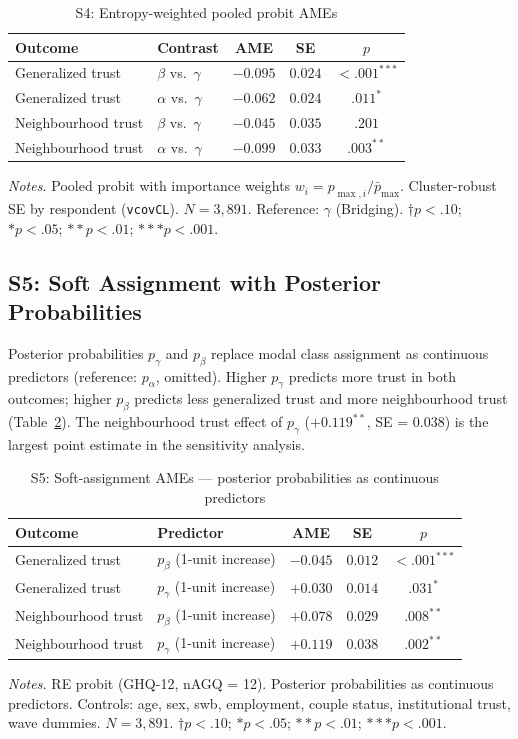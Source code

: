 \documentclass[12pt, a4paper]{article}
\newcommand{\tablenote}[1]{\vspace{4pt}\par\footnotesize\textit{Notes.} #1}
\begin{document}
\begin{table}[H]
\centering
\caption{S4: Entropy-weighted pooled probit AMEs}
\label{tab:A15_entropy}
\small
\begin{tabular}{llccc}
\hline\hline
  Outcome & Contrast & AME & SE & $p$ \\
\hline
  Generalized trust   & $\beta$ vs.\ $\gamma$ & $-0.095$ & $0.024$ & $<.001^{***}$ \\
  Generalized trust   & $\alpha$ vs.\ $\gamma$ & $-0.062$ & $0.024$ & $.011^{*}$ \\
  Neighbourhood trust & $\beta$ vs.\ $\gamma$ & $-0.045$ & $0.035$ & $.201$ \\
  Neighbourhood trust & $\alpha$ vs.\ $\gamma$ & $-0.099$ & $0.033$ & $.003^{**}$ \\
\hline\hline
\end{tabular}
\tablenote{Pooled probit with importance weights $w_i = p_{\max,i}/\bar{p}_{\max}$.
Cluster-robust SE by respondent (\texttt{vcovCL}). $N = 3{,}891$.
Reference: $\gamma$ (Bridging).
$\dagger p<.10$; $* p<.05$; $** p<.01$; $*** p<.001$.}
\end{table}

\subsection{S5: Soft Assignment with Posterior Probabilities}
\label{sec:s5}

Posterior probabilities $p_{\gamma}$ and $p_{\beta}$ replace modal class
assignment as continuous predictors (reference: $p_{\alpha}$, omitted).
Higher $p_{\gamma}$ predicts more trust in both outcomes; higher $p_{\beta}$
predicts less generalized trust and more neighbourhood trust
(Table~\ref{tab:A16_soft}). The neighbourhood trust effect of $p_{\gamma}$
($+0.119^{**}$, SE = 0.038) is the largest point estimate in the sensitivity
analysis.

\begin{table}[H]
\centering
\caption{S5: Soft-assignment AMEs --- posterior probabilities as continuous predictors}
\label{tab:A16_soft}
\small
\begin{tabular}{llccc}
\hline\hline
  Outcome & Predictor & AME & SE & $p$ \\
\hline
  Generalized trust   & $p_{\beta}$ (1-unit increase)  & $-0.045$ & $0.012$ & $<.001^{***}$ \\
  Generalized trust   & $p_{\gamma}$ (1-unit increase) & $+0.030$ & $0.014$ & $.031^{*}$ \\
  Neighbourhood trust & $p_{\beta}$ (1-unit increase)  & $+0.078$ & $0.029$ & $.008^{**}$ \\
  Neighbourhood trust & $p_{\gamma}$ (1-unit increase) & $+0.119$ & $0.038$ & $.002^{**}$ \\
\hline\hline
\end{tabular}
\tablenote{RE probit (GHQ-12, nAGQ = 12). Posterior probabilities as
continuous predictors. Controls: age, sex, swb, employment, couple status,
institutional trust, wave dummies. $N = 3{,}891$.
$\dagger p<.10$; $* p<.05$; $** p<.01$; $*** p<.001$.}
\end{table}
\end{document}
